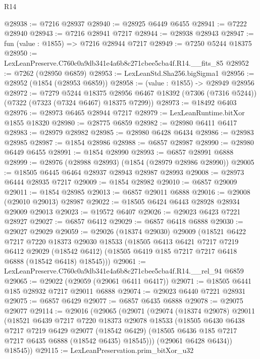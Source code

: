 \begin{lexlean}{R14}
\begin{coremodule}
@28938 := @7216 @28937
@28940 := @28925 @6449 @6455
@28941 := @7222 @28940
@28943 := @7216 @28941 @7217
@28944 := @28938 @28943
@28947 := fun (value : @1855) => @7216 @28944 @7217
@28949 := @7250 @5244 @18375
@28950 := LexLeanPreserve.C760c0a9db341e4a6b8c271cbee5cba4f.R14.__fits_85
@28952 := @7262 (@28950 @6859)
@28953 := LexLeanStd.Sha256.bigSigma1
@28956 := @28952 (@1854 (@28953 @6859))
@28958 := (value : @1855) -> @28949 @28956
@28972 := @7279
    @5244
    @18375
    @28956
    @6467
    @18392
    (@7306 (@7316 @5244))
    (@7322 (@7323 (@7324 @6467) @18375 @7299))
@28973 := @18492 @6403
@28976 := @28973 @6465 @28944 @7217
@28979 := LexLeanRuntime.bitXor @1855 @18320
@28980 := @28775 @6859
@28982 := @28980 @6411 @6417
@28983 := @28979 @28982
@28985 := @28980 @6428 @6434
@28986 := @28983 @28985
@28987 := @1854 @28986
@28988 := @6857 @28987
@28990 := @28980 @6449 @6455
@28991 := @1854 @28990
@28993 := @6857 @28991 @6888
@28999 := @28976 (@28988 @28993) (@1854 (@28979 @28986 @28990))
@29005 := @18505 @6445 @6464 @28937 @28943 @28987 @28993
@29008 := @28973 @6444 @28935 @7217
@29009 := @1854 @28982
@29010 := @6857 @29009
@29011 := @1854 @28985
@29013 := @6857 @29011 @6888
@29016 := @29008 (@29010 @29013) @28987
@29022 := @18505 @6424 @6443 @28928 @28934 @29009 @29013
@29023 := @19572 @6407
@29026 := @29023 @6423 @7221 @28927
@29027 := @6857 @6412
@29029 := @6857 @6418 @6888
@29030 := @29027 @29029
@29059 := @29026
    (@18374 @29030)
    @29009
    (@18521
      @6422
      @7217
      @7220
      @18373
      @29030
      @18533
      (@18505
        @6413
        @6421
        @7217
        @7219
        @6412
        @29029
        (@18542 @6412)
        (@18505 @6419 @185 @7217 @7217 @6418 @6888 (@18542 @6418) @18545)))
@29061 := LexLeanPreserve.C760c0a9db341e4a6b8c271cbee5cba4f.R14.__rel_94 @6859
@29065 := @29022 (@29059 (@29061 @6411 @6417))
@29071 := @18505 @6441 @185 @28932 @7217 @29011 @6888
@29074 := @29023 @6440 @7221 @28931
@29075 := @6857 @6429
@29077 := @6857 @6435 @6888
@29078 := @29075 @29077
@29114 := @29016
    (@29065
      (@29071
        (@29074
          (@18374 @29078)
          @29011
          (@18521
            @6439
            @7217
            @7220
            @18373
            @29078
            @18533
            (@18505
              @6430
              @6438
              @7217
              @7219
              @6429
              @29077
              (@18542 @6429)
              (@18505 @6436 @185 @7217 @7217 @6435 @6888 (@18542 @6435) @18545)))
          (@29061 @6428 @6434))
        @18545))
@29115 := LexLeanPreservation.prim_bitXor_u32

\end{coremodule}
\end{lexlean}
